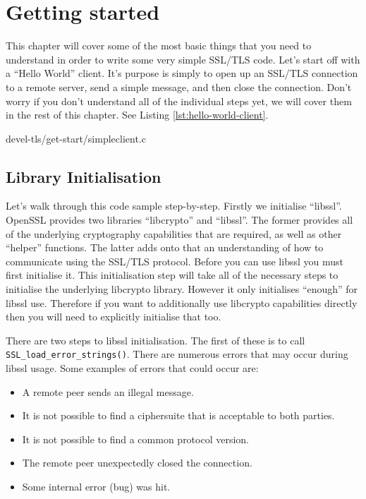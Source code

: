 \chapter{Getting started}
This chapter will cover some of the most basic things that you need to 
understand in order to write some very simple SSL/TLS code. Let's start off with
a ``Hello World'' client. It's purpose is simply to open up an SSL/TLS
connection to a remote server, send a simple message, and then close the
connection. Don't worry if you don't understand all of the individual steps yet,
we will cover them in the rest of this chapter. See Listing
\ref{lst:hello-world-client}.


{devel-tls/get-start/simpleclient.c}

\section{Library Initialisation}
\label{sec:getstart-library-init}

Let's walk through this code sample step-by-step. Firstly we initialise 
``libssl''. OpenSSL provides two libraries ``libcrypto'' and ``libssl''. The 
former provides all of the underlying cryptography capabilities that are 
required, as well as other ``helper'' functions. The latter adds onto that an
understanding of how to communicate using the SSL/TLS protocol. Before you can 
use libssl you must first initialise it. This initialisation step will take all 
of the necessary steps to initialise the underlying libcrypto library. However 
it only initialises ``enough'' for libssl use. Therefore if you want to 
additionally use libcrypto capabilities directly then you will need to 
explicitly initialise that too.

There are two steps to libssl initialisation. The first of these is to call 
\verb!SSL_load_error_strings()!. There are numerous errors that may occur 
during libssl usage. Some examples of errors that could occur are:
\begin{itemize}
\item A remote peer sends an illegal message.
\item It is not possible to find a ciphersuite that is acceptable to both 
parties.
\item It is not possible to find a common protocol version. 
\item The remote peer unexpectedly closed the connection.
\item Some internal error (bug) was hit.
\end{itemize}

